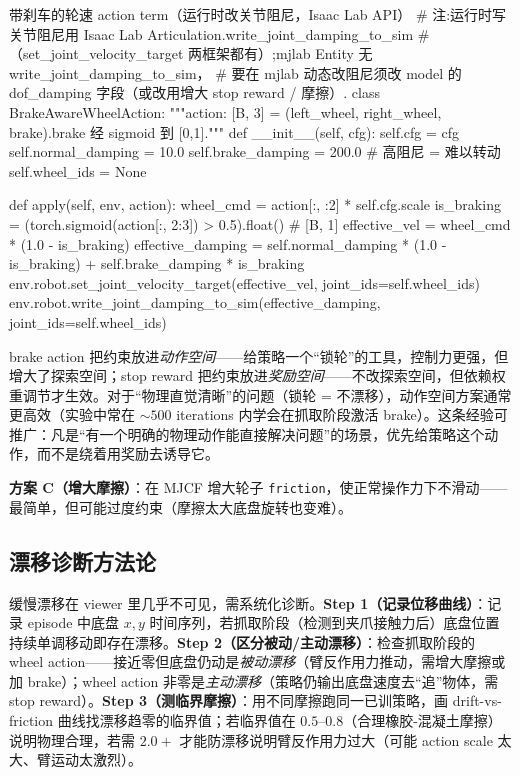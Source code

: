 \begin{codebox}[Python]{带刹车的轮速 action term（运行时改关节阻尼，Isaac Lab API）}
# 注:运行时写关节阻尼用 Isaac Lab Articulation.write_joint_damping_to_sim
# （set_joint_velocity_target 两框架都有）;mjlab Entity 无 write_joint_damping_to_sim，
# 要在 mjlab 动态改阻尼须改 model 的 dof_damping 字段（或改用增大 stop reward / 摩擦）.
class BrakeAwareWheelAction:
    """action: [B, 3] = (left_wheel, right_wheel, brake).brake 经 sigmoid 到 [0,1]."""
    def __init__(self, cfg):
        self.cfg = cfg
        self.normal_damping = 10.0
        self.brake_damping  = 200.0    # 高阻尼 = 难以转动
        self.wheel_ids = None

    def apply(self, env, action):
        wheel_cmd  = action[:, :2] * self.cfg.scale
        is_braking = (torch.sigmoid(action[:, 2:3]) > 0.5).float()   # [B, 1]
        effective_vel     = wheel_cmd * (1.0 - is_braking)
        effective_damping = self.normal_damping * (1.0 - is_braking) + self.brake_damping * is_braking
        env.robot.set_joint_velocity_target(effective_vel, joint_ids=self.wheel_ids)
        env.robot.write_joint_damping_to_sim(effective_damping, joint_ids=self.wheel_ids)
\end{codebox}

\begin{insight}\label{ins:rlmc-wh-where}
brake action 把约束放进\emph{动作空间}——给策略一个“锁轮”的工具，控制力更强，但增大了探索空间；stop reward 把约束放进\emph{奖励空间}——不改探索空间，但依赖权重调节才生效。对于“物理直觉清晰”的问题（锁轮 = 不漂移），动作空间方案通常更高效（实验中常在 $\sim 500$ iterations 内学会在抓取阶段激活 brake）。这条经验可推广：凡是“有一个明确的物理动作能直接解决问题”的场景，优先给策略这个动作，而不是绕着用奖励去诱导它。
\end{insight}

\textbf{方案 C（增大摩擦）}：在 MJCF 增大轮子 \verb|friction|，使正常操作力下不滑动——最简单，但可能过度约束（摩擦太大底盘旋转也变难）。

\subsection{漂移诊断方法论}
\label{sec:rlmc-wh-drift-diag}

缓慢漂移在 viewer 里几乎不可见，需系统化诊断。\textbf{Step 1（记录位移曲线）}：记录 episode 中底盘 $x,y$ 时间序列，若抓取阶段（检测到夹爪接触力后）底盘位置持续单调移动即存在漂移。\textbf{Step 2（区分被动/主动漂移）}：检查抓取阶段的 wheel action——接近零但底盘仍动是\emph{被动漂移}（臂反作用力推动，需增大摩擦或加 brake）；wheel action 非零是\emph{主动漂移}（策略仍输出底盘速度去“追”物体，需 stop reward）。\textbf{Step 3（测临界摩擦）}：用不同摩擦跑同一已训策略，画 drift-vs-friction 曲线找漂移趋零的临界值；若临界值在 $0.5$--$0.8$（合理橡胶-混凝土摩擦）说明物理合理，若需 $2.0+$ 才能防漂移说明臂反作用力过大（可能 action scale 太大、臂运动太激烈）。

